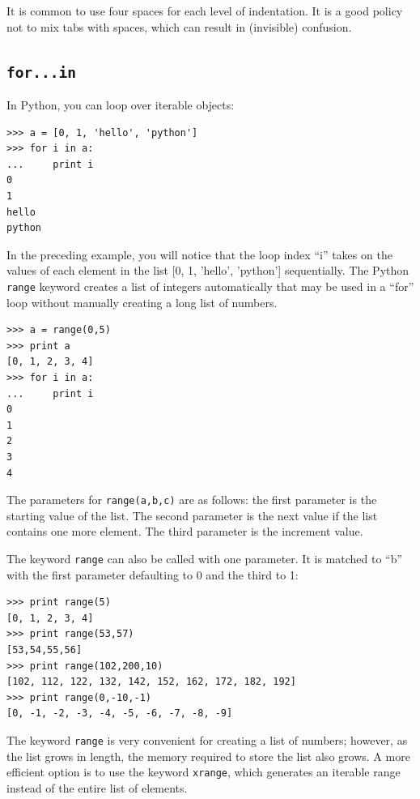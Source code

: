 \documentclass[justified,sixbynine]{tufte-book}
\def\ft{\small\tt}
\theoremstyle{plain}%
\theoremstyle{definition}
\theoremstyle{remark}
\begin{document}
\begin{fullwidth}
It is common to use four spaces for each level of indentation.
It is a good policy not to mix tabs with spaces, which can result in (invisible) confusion.

\goodbreak\subsection{{\ft for...in}}

In Python, you can loop over iterable objects:

\begin{lstlisting}
>>> a = [0, 1, 'hello', 'python']
>>> for i in a:
...     print i
0
1
hello
python
\end{lstlisting}

In the preceding example, you will notice that the loop index ``i'' takes on the values of each element in the list [0, 1, 'hello', 'python'] sequentially.  The Python {\ft range} keyword creates a list of integers automatically that may be used in a ``for'' loop without manually creating a long list of numbers.

\begin{lstlisting}
>>> a = range(0,5)
>>> print a
[0, 1, 2, 3, 4]
>>> for i in a:
...     print i
0
1
2
3
4
\end{lstlisting}

The parameters for {\ft range(a,b,c)} are as follows: the first parameter is the starting value of the list.  The second parameter is the next value if the list contains one more element.  The third parameter is the increment value.

The keyword {\ft range} can also be called with one parameter. It is matched to ``b'' with the first parameter defaulting to 0 and the third to 1:

\begin{lstlisting}
>>> print range(5)
[0, 1, 2, 3, 4]
>>> print range(53,57)
[53,54,55,56]
>>> print range(102,200,10)
[102, 112, 122, 132, 142, 152, 162, 172, 182, 192]
>>> print range(0,-10,-1)
[0, -1, -2, -3, -4, -5, -6, -7, -8, -9]
\end{lstlisting}

The keyword {\ft range} is very convenient for creating a list of numbers; however, as the list grows in length, the memory required to store the list also grows.  A more efficient option is to use the keyword {\ft xrange}, which generates an iterable range instead of the entire list of elements.


\end{fullwidth}
\end{document}
